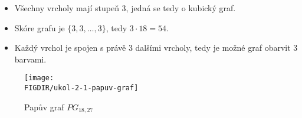 \documentclass[10pt, a4paper]{ReportSheet}
\begin{document}
    \begin{itemize}
        \item Všechny vrcholy mají stupeň 3, jedná se tedy o kubický graf.
        \item Skóre grafu je $\{3, 3, \dots, 3\}$, tedy $3 \cdot 18 = 54$.
        \item Každý vrchol je spojen s právě 3 dalšími vrcholy, tedy je možné graf obarvit 3 barvami.
    \end{itemize}

    \begin{figure}[H]
        \centering
        \texttt{[image: \\FIGDIR/ukol-2-1-papuv-graf]}
        \caption{Papův graf $PG_{18, 27}$}
        \label{fig:ukol-2-1-papuv-graf}\label{fig:figure}
    \end{figure}

    \newpage
\end{document}
